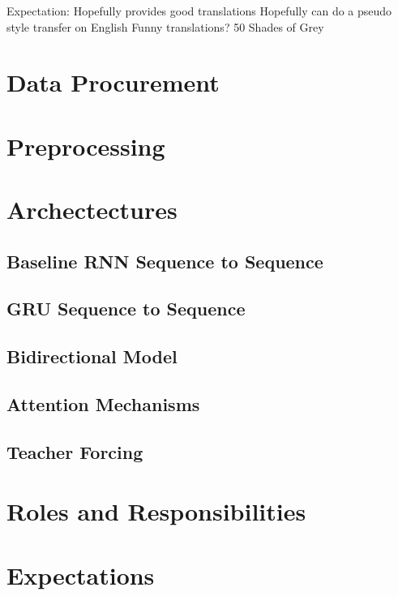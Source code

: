 \documentclass[twoside,twocolumn]{article}
\begin{document}
Expectation:
	Hopefully provides good translations
	Hopefully can do a pseudo style transfer on English
	Funny translations? 50 Shades of Grey
\section{Data Procurement}

\section{Preprocessing}

\section{Archectectures}

\subsection{Baseline RNN Sequence to Sequence}

\subsection{GRU Sequence to Sequence}

\subsection{Bidirectional Model}

\subsection{Attention Mechanisms}

\subsection{Teacher Forcing}

\section{Roles and Responsibilities}

\section{Expectations}



\end{document}
